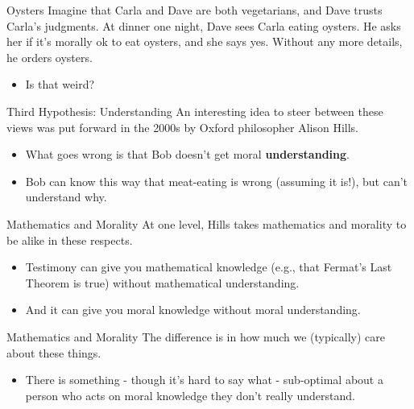 \documentclass[
  17pt,
  letterpaper,
  ignorenonframetext,
  aspectratio=169,
  handout]{beamer}
\providecommand{\tightlist}{%
  \setlength{\itemsep}{0pt}\setlength{\parskip}{0pt}}\usepackage{longtable,booktabs,array}
\begin{document}
\begin{frame}{Oysters}
\protect\hypertarget{oysters}{}
Imagine that Carla and Dave are both vegetarians, and Dave trusts
Carla's judgments. At dinner one night, Dave sees Carla eating oysters.
He asks her if it's morally ok to eat oysters, and she says yes. Without
any more details, he orders oysters.

\begin{itemize}[<+->]
\tightlist
\item
  Is that weird?
\end{itemize}
\end{frame}

\begin{frame}{Third Hypothesis: Understanding}
\protect\hypertarget{third-hypothesis-understanding}{}
An interesting idea to steer between these views was put forward in the
2000s by Oxford philosopher Alison Hills.

\begin{itemize}[<+->]
\tightlist
\item
  What goes wrong is that Bob doesn't get moral \textbf{understanding}.
\item
  Bob can know this way that meat-eating is wrong (assuming it is!), but
  can't understand why.
\end{itemize}
\end{frame}

\begin{frame}{Mathematics and Morality}
\protect\hypertarget{mathematics-and-morality-1}{}
At one level, Hills takes mathematics and morality to be alike in these
respects.

\begin{itemize}[<+->]
\tightlist
\item
  Testimony can give you mathematical knowledge (e.g., that Fermat's
  Last Theorem is true) without mathematical understanding.
\item
  And it can give you moral knowledge without moral understanding.
\end{itemize}
\end{frame}

\begin{frame}{Mathematics and Morality}
\protect\hypertarget{mathematics-and-morality-2}{}
The difference is in how much we (typically) care about these things.

\begin{itemize}[<+->]
\tightlist
\item
  There is something - though it's hard to say what - sub-optimal about
  a person who acts on moral knowledge they don't really understand.
\end{itemize}
\end{frame}
\end{document}
